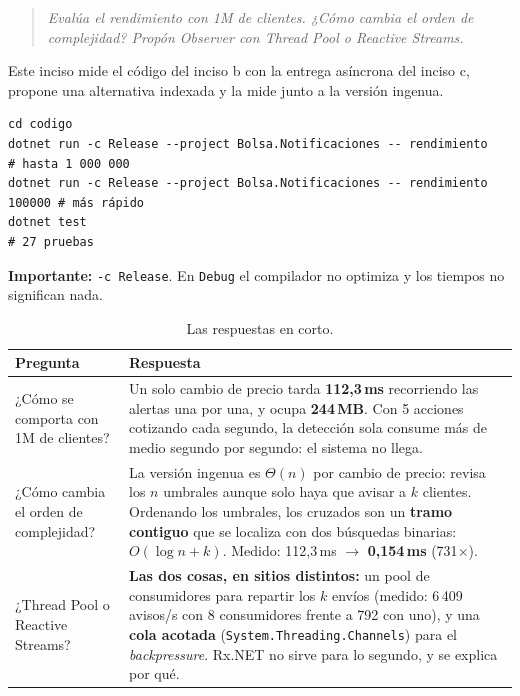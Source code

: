 
\begin{quote}
\itshape
Evalúa el rendimiento con 1M de clientes. ¿Cómo cambia el orden de complejidad? Propón
Observer con Thread Pool o Reactive Streams.
\end{quote}

Este inciso mide el código del inciso b con la entrega asíncrona del inciso c, propone una
alternativa indexada y la mide junto a la versión ingenua.

\begin{lstlisting}[language={}, numbers=none, basicstyle=\ttfamily\footnotesize, columns=fullflexible, keepspaces=true]
cd codigo
dotnet run -c Release --project Bolsa.Notificaciones -- rendimiento        # hasta 1 000 000
dotnet run -c Release --project Bolsa.Notificaciones -- rendimiento 100000 # más rápido
dotnet test                                                                # 27 pruebas
\end{lstlisting}

\textbf{Importante:} \texttt{-c Release}. En \texttt{Debug} el compilador no optimiza y los
tiempos no significan nada.

\begin{table}[H]
\centering
\small
\begin{tabularx}{\textwidth}{>{\raggedright\arraybackslash}p{4.1cm} >{\raggedright\arraybackslash}X}
\toprule
\textbf{Pregunta} & \textbf{Respuesta} \\
\midrule
¿Cómo se comporta con 1M de clientes? &
Un solo cambio de precio tarda \textbf{112,3\,ms} recorriendo las alertas una por una, y
ocupa \textbf{244\,MB}. Con 5 acciones cotizando cada segundo, la detección sola consume más
de medio segundo por segundo: el sistema no llega. \\
\addlinespace
¿Cómo cambia el orden de complejidad? &
La versión ingenua es $\Theta(n)$ por cambio de precio: revisa los $n$ umbrales aunque solo
haya que avisar a $k$ clientes. Ordenando los umbrales, los cruzados son un \textbf{tramo
contiguo} que se localiza con dos búsquedas binarias: $O(\log n + k)$. Medido:
112,3\,ms $\rightarrow$ \textbf{0,154\,ms} (731$\times$). \\
\addlinespace
¿Thread Pool o Reactive Streams? &
\textbf{Las dos cosas, en sitios distintos:} un pool de consumidores para repartir los $k$
envíos (medido: 6\,409 avisos/s con 8 consumidores frente a 792 con uno), y una \textbf{cola
acotada} (\texttt{System.Threading.Channels}) para el \emph{backpressure}. Rx.NET no sirve
para lo segundo, y se explica por qué. \\
\bottomrule
\end{tabularx}
\caption{Las respuestas en corto.}
\end{table}

